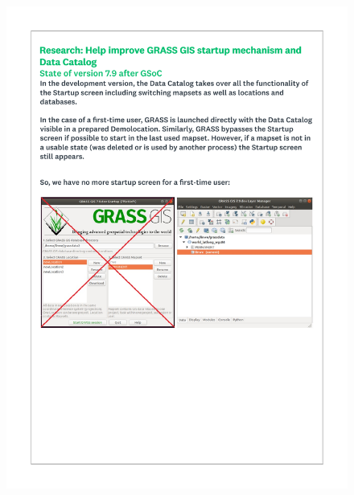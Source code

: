 \documentclass[a4paper,10pt,twoside]{article}
\begin{document}
 \newpage
 \begin{figure}[hbt!]
 \begin{center}
 \includegraphics[width=16cm]{../surveys/questionnaires/survey1_part1_page2_intro.pdf}
 \end{center}
 \end{figure}
  
\end{document}
